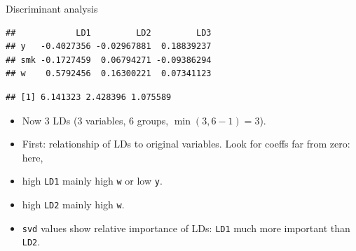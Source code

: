 \documentclass[ignorenonframetext,]{beamer}
\newenvironment{Shaded}{\begin{snugshade}}{\end{snugshade}}
\newcommand{\DataTypeTok}[1]{\textcolor[rgb]{0.13,0.29,0.53}{#1}}
\newcommand{\FloatTok}[1]{\textcolor[rgb]{0.00,0.00,0.81}{#1}}
\newcommand{\KeywordTok}[1]{\textcolor[rgb]{0.13,0.29,0.53}{\textbf{#1}}}
\newcommand{\NormalTok}[1]{#1}
\newcommand{\OperatorTok}[1]{\textcolor[rgb]{0.81,0.36,0.00}{\textbf{#1}}}
\newcommand{\StringTok}[1]{\textcolor[rgb]{0.31,0.60,0.02}{#1}}
\begin{document}
\begin{frame}[fragile]{Discriminant analysis}
\protect\hypertarget{discriminant-analysis-1}{}

\begin{Shaded}
\end{Shaded}

\begin{verbatim}
##            LD1         LD2         LD3
## y   -0.4027356 -0.02967881  0.18839237
## smk -0.1727459  0.06794271 -0.09386294
## w    0.5792456  0.16300221  0.07341123
\end{verbatim}

\begin{Shaded}
\end{Shaded}

\begin{verbatim}
## [1] 6.141323 2.428396 1.075589
\end{verbatim}

\begin{itemize}
\item
  Now 3 LDs (3 variables, 6 groups, \(\min(3,6-1)=3\)).
\item
  First: relationship of LDs to original variables. Look for coeffs far
  from zero: here,
\item
  high \texttt{LD1} mainly high \texttt{w} or low \texttt{y}.
\item
  high \texttt{LD2} mainly high \texttt{w}.
\item
  \texttt{svd} values show relative importance of LDs: \texttt{LD1} much
  more important than \texttt{LD2}.
\end{itemize}

\end{frame}
\end{document}
